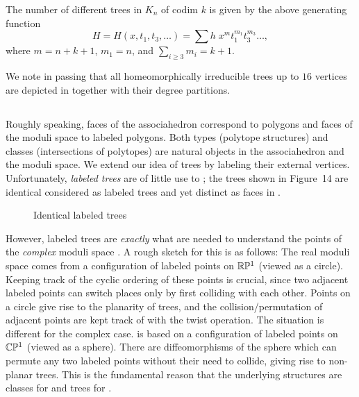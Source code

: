 \documentclass[10pt]{amsart}
\begin{document}
        \begin{thm}
        The number of different trees in $K_n$ of codim $k$ is given by the above generating function
        $$H = H(x, t_1, t_3, \ldots) = \sum h \; x^m t_1^{m_1} t_3^{m_3} \ldots,$$ where $m=n+k+1$, $m_1=n$, and $\displaystyle{\sum_{i \geq 3} m_i = k+1}$.
        \end{thm}
        
        \noindent We note in passing that all homeomorphically irreducible trees up to $16$ vertices are depicted in \cite{rw} together with their degree partitions.
        
                
        \subsection{}
        Roughly speaking, faces of the associahedron correspond to polygons and faces of the moduli space to labeled polygons. Both types (polytope structures) and classes (intersections of polytopes) are natural objects in the associahedron and the moduli space.  We extend our idea of trees by labeling their external vertices.  Unfortunately, {\em labeled trees} are of little use to ; the trees shown in Figure~14 are identical considered as labeled trees and yet distinct as faces in .
         
        \begin{figure}[h]
        \caption{Identical labeled trees}
        \label{phylolabel}
        \end{figure}
        
        However, labeled trees are {\em exactly} what are needed to understand the points of the {\em complex} moduli space .  A rough sketch for this is as follows: The real moduli space  comes from a configuration of labeled points on ${\mathbb R} {\mathbb P}^1$ (viewed as a circle).  Keeping track of the cyclic ordering of these points is crucial, since two adjacent labeled points can switch places only by  first colliding with each other.  Points on a circle give rise to the planarity of trees, and the collision/permutation of adjacent points are kept track of with the twist operation. The situation is different for the complex case.   is based on a configuration of labeled points on ${\mathbb C} {\mathbb P}^1$ (viewed as a sphere).  There are diffeomorphisms of the sphere which can permute any two labeled points without their need to collide, giving rise to non-planar trees. This is the fundamental reason that the underlying structures are classes for  and trees for .
        
\end{document}
